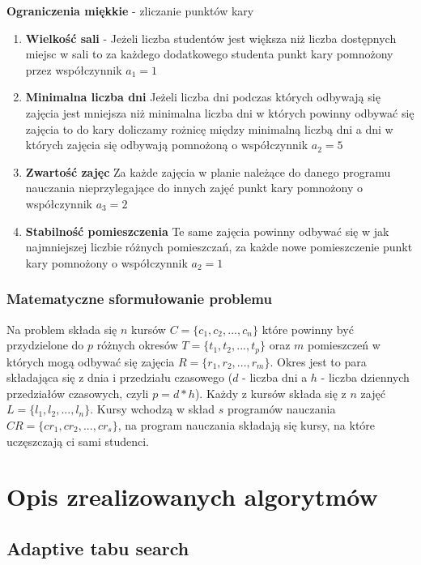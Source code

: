 \documentclass[11pt]{report}
\begin{document}
\textbf{Ograniczenia miękkie} - zliczanie punktów kary
\begin{enumerate}
\item \textbf{Wielkość sali} - Jeżeli liczba studentów jest większa niż liczba dostępnych miejsc w sali to za każdego dodatkowego studenta punkt kary pomnożony przez współczynnik ${a_{1} = 1}$ 
\item \textbf{Minimalna liczba dni}
Jeżeli liczba dni podczas których odbywają się zajęcia jest mniejsza niż minimalna liczba dni w których powinny odbywać się zajęcia to do kary doliczamy rożnicę między minimalną liczbą dni a dni w których zajęcia się odbywają pomnożoną o współczynnik $a_{2} = 5$ 
\item \textbf{Zwartość zajęc}
Za każde zajęcia w planie należące do danego programu nauczania nieprzylegające do innych zajęć punkt kary pomnożony o współczynnik ${a_{3} = 2}$
\item \textbf{Stabilność pomieszczenia}
Te same zajęcia powinny odbywać się w jak najmniejszej liczbie różnych pomieszczań, za każde nowe pomieszczenie punkt kary pomnożony o współczynnik ${a_{2} = 1}$
\end{enumerate}

\subsection{Matematyczne sformułowanie problemu} \cite{tabu}
\par Na problem składa się ${n}$ kursów ${C = \{c_{1}, c_{2},...,c_{n}\}}$ które powinny być przydzielone do ${p}$ różnych okresów ${T = \{t_{1}, t_{2},...,t_{p}\}}$ oraz ${m}$ pomieszczeń w których mogą odbywać się zajęcia ${R = \{r_{1}, r_{2},...,r_{m}\}}$. Okres jest to para składająca się z dnia i przedziału czasowego (${d}$ - liczba dni a ${h}$ - liczba dziennych przedziałów czasowych, czyli ${p = d * h}$). Każdy z kursów składa się z ${n}$ zajęć ${L = \{l_{1},l_{2},...,l_{n}\}}$. Kursy wchodzą w skład ${s}$ programów nauczania ${CR = \{cr_{1}, cr_{2}, ..., cr_{s}\}}$, na program nauczania składają się kursy, na które uczęszczają ci sami studenci. 

\chapter{Opis zrealizowanych algorytmów}
\section{Adaptive tabu search}
\author{Tomasz Dziopa, Katarzyna Śmietanka}
\end{document}
